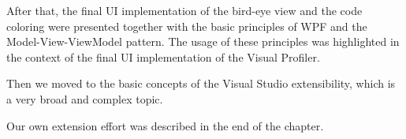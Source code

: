 After that, the final UI implementation of the bird-eye view and the code coloring were presented together with the basic principles of WPF and the Model-View-ViewModel pattern. The usage of these principles was highlighted in the context of the final UI implementation of the Visual Profiler.

Then we moved to the basic concepts of the Visual Studio extensibility, which is a very broad and complex topic.

Our own extension effort was described in the end of the chapter.












